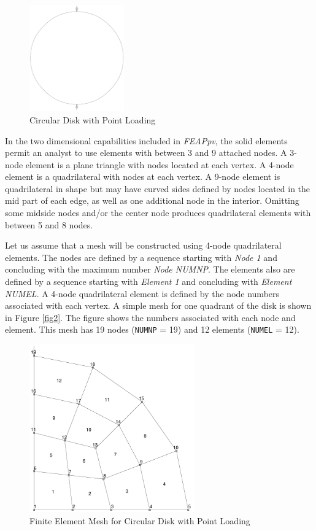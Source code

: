 \begin{figure}[ht!]
\centerline {\hfil \includegraphics[width=1.6in]{figs/fig1} \hfil}
\caption{Circular Disk with Point Loading}
\label{fig3}
\end{figure}

In the two dimensional capabilities included in
{\sl FEAPpv}, the solid elements permit an analyst to use elements with
between 3 and 9 attached nodes.  A 3-node element is a plane triangle
with nodes located at each vertex.  A 4-node element is a quadrilateral with
nodes at each vertex.  A 9-node element is quadrilateral in shape but
may have curved sides defined by nodes located in the mid part of
each edge, as well as one
additional node in the interior.  Omitting some midside nodes and/or
the center node produces quadrilateral elements with between 5 and 8 nodes.

Let us assume that a mesh will be constructed using 4-node
quadrilateral elements.  The nodes are defined by a sequence
starting with {\it Node 1} and concluding with the maximum number {\it
Node NUMNP}.
The elements also are defined by a sequence starting with {\it Element 1}
and concluding with {\it Element NUMEL}.
A 4-node quadrilateral element is defined by
the node numbers associated with each vertex.  A simple
mesh for one quadrant of the disk is shown in Figure \ref{fig2}.
The figure shows
the numbers associated with each node and element.
This mesh has 19 nodes ({\tt NUMNP} = 19) and 12 elements ({\tt NUMEL} = 12).

\begin{figure}[ht!]
\centerline {\hfil \includegraphics[width=2.8in]{figs/fig2} \hfil}
\caption{Finite Element Mesh for Circular Disk with Point Loading}
\label{fig4}
\end{figure}

